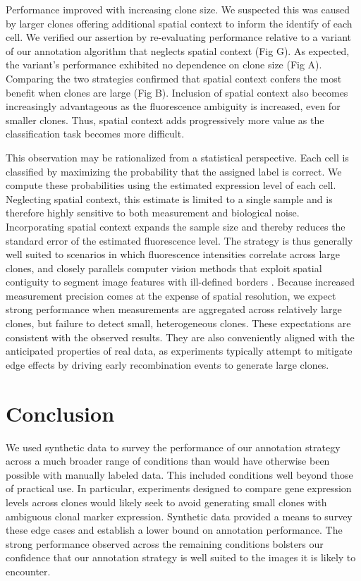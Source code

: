\documentclass[10pt,letterpaper]{article}
\begin{document}
Performance improved with increasing clone size. We suspected this was caused by larger clones offering additional spatial context to inform the identify of each cell. We verified our assertion by re-evaluating performance relative to a variant of our annotation algorithm that neglects spatial context (Fig G). As expected, the variant's performance exhibited no dependence on clone size (Fig A). Comparing the two strategies confirmed that spatial context confers the most benefit when clones are large (Fig B). Inclusion of spatial context also becomes increasingly advantageous as the fluorescence ambiguity is increased, even for smaller clones. Thus, spatial context adds progressively more value as the classification task becomes more difficult.

This observation may be rationalized from a statistical perspective. Each cell is classified by maximizing the probability that the assigned label is correct. We compute these probabilities using the estimated expression level of each cell. Neglecting spatial context, this estimate is limited to a single sample and is therefore highly sensitive to both measurement and biological noise. Incorporating spatial context expands the sample size and thereby reduces the standard error of the estimated fluorescence level. The strategy is thus generally well suited to scenarios in which fluorescence intensities correlate across large clones, and closely parallels computer vision methods that exploit spatial contiguity to segment image features with ill-defined borders \cite{Nguyen2012}. Because increased measurement precision comes at the expense of spatial resolution, we expect strong performance when measurements are aggregated across relatively large clones, but failure to detect small, heterogeneous clones. These expectations are consistent with the observed results. They are also conveniently aligned with the anticipated properties of real data, as experiments typically attempt to mitigate edge effects by driving early recombination events to generate large clones.



\section*{Conclusion}

We used synthetic data to survey the performance of our annotation strategy across a much broader range of conditions than would have otherwise been possible with manually labeled data. This included conditions well beyond those of practical use. In particular, experiments designed to compare gene expression levels across clones would likely seek to avoid generating small clones with ambiguous clonal marker expression. Synthetic data provided a means to survey these edge cases and establish a lower bound on annotation performance. The strong performance observed across the remaining conditions bolsters our confidence that our annotation strategy is well suited to the images it is likely to encounter.
\end{document}
